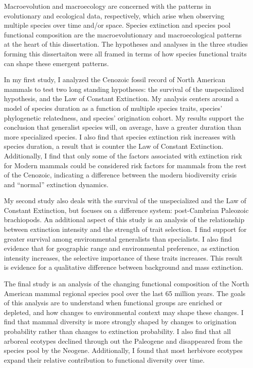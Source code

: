 \abstract

Macroevolution and macroecology are concerned with the patterns in evolutionary and ecological data, respectively, which arise when observing multiple species over time and/or space. Species extinction and species pool functional composition are the macroevolutionary and macroecological patterns at the heart of this dissertation. The hypotheses and analyses in the three studies forming this dissertaiton were all framed in terms of how species functional traits can shape these emergent patterns. 

In my first study, I analyzed the Cenozoic fossil record of North American mammals to test two long standing hypotheses: the survival of the unspecialized hypothesis, and the Law of Constant Extinction. My analysis centers around a model of species duration as a function of multiple species traits, species' phylogenetic relatedness, and species' origination cohort. My results support the conclusion that generalist species will, on average, have a greater duration than more specialized species. I also find that species extinction risk increases with species duration, a result that is counter the Law of Constant Extinction. Additionally, I find that only some of the factors associated with extinction risk for Modern mammals could be considered risk factors for mammals from the rest of the Cenozoic, indicating a difference between the modern biodiversity crisis and ``normal'' extinction dynamics.

My second study also deals with the survival of the unspecialized and the Law of Constant Extinction, but focuses on a difference system: post-Cambrian Paleozoic brachiopods. An additional aspect of this study is an analysis of the relationship between extinction intensity and the strength of trait selection. I find support for greater survival among environmental generalists than specialists. I also find evidence that for geographic range and environmental preference, as extinction intensity increases, the selective importance of these traits increases. This result is evidence for a qualitative difference between background and mass extinction.

The final study is an analysis of the changing functional composition of the North American mammal regional species pool over the last 65 million years. The goals of this analysis are to understand when functional groups are enriched or depleted, and how changes to environmental context may shape these changes. I find that mammal diversity is more strongly shaped by changes to origination probability rather than changes to extinction probability. I also find that all arboreal ecotypes declined through out the Paleogene and disappeared from the species pool by the Neogene. Additionally, I found that most herbivore ecotypes expand their relative contribution to functional diversity over time.

